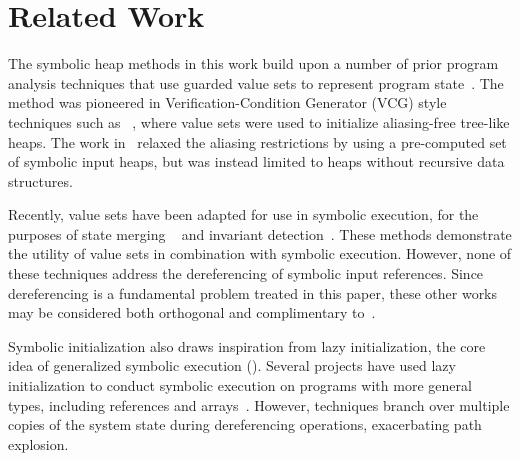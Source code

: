 \section{Related Work}
\label{sec:related}
%
The symbolic heap methods in this work build upon a
number of prior program analysis techniques that use guarded value sets to
represent program
state~\cite{Sen:2014,Torlak:2014,Xie:2005,Dillig:2011,Elkarablieh:2009}. 
The method was pioneered in Verification-Condition Generator (VCG) style techniques such as ~\cite{Xie:2005}, where value sets were used to 
initialize aliasing-free tree-like heaps. The work in~\cite{Dillig:2011} relaxed the aliasing restrictions by using a pre-computed set of symbolic input heaps, but was instead limited to heaps without recursive data structures. 

Recently, value sets have been adapted for use in symbolic execution, for the purposes of state merging ~\cite{Sen:2014,Torlak:2014} and invariant detection~\cite{Ferrara:2014}. These methods demonstrate the utility of value sets in combination with symbolic execution. However, none of these techniques address the dereferencing of symbolic input references. Since dereferencing is a fundamental problem treated in this paper, these other works may be considered both orthogonal and complimentary to~\symtxt{}.

Symbolic initialization also draws inspiration from lazy initialization, the core idea of generalized symbolic execution (\gsetxt{})\cite{GSE03}. Several projects have used lazy initialization to conduct symbolic execution on programs with more general types,
including references and
arrays~\cite{KiasanKunit,Cadar:2008,Deng:2007,Rosner:2015,Blackshear:2013,Filieri:2015}. However, \gsetxt{} techniques branch over
multiple copies of the system state during dereferencing operations,
exacerbating path explosion.


